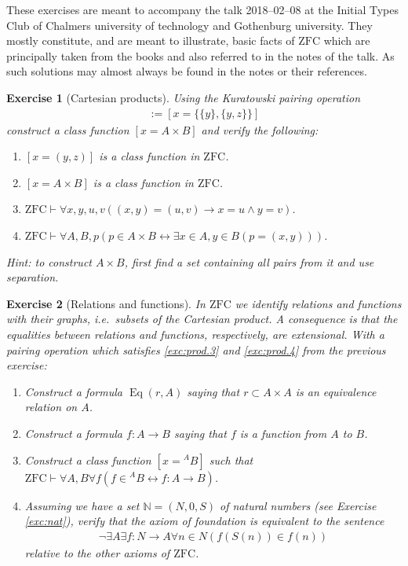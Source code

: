 \documentclass{scrartcl}
\theoremstyle{definition}
\theoremstyle{plain}
\theoremstyle{remark}
\newcommand{\N}{\ensuremath{\mathbb{N}}}
\newcommand{\ZFC}{\ensuremath{\mathrm{ZFC}}}
\newcommand{\limp}{\rightarrow}
\newcommand{\liff}{\leftrightarrow}
\newcommand{\eqdef}{:=}
\DeclareMathOperator{\Eq}{Eq}
\theoremstyle{plain}
\newtheorem{Exc}{Exercise}
\begin{document}
These exercises are meant to accompany the talk 2018--02--08 at the Initial Types Club of Chalmers university of technology and Gothenburg university. They mostly constitute, and are meant to illustrate, basic facts of $\ZFC$ which are principally taken from the books \cite{moschovakis:2006} and \cite{jech:2002} also referred to in the notes of the talk. As such solutions may almost always be found in the notes or their references.

\begin{Exc}[Cartesian products\label{exc:prod}]
  Using the Kuratowski pairing operation
  \begin{align*}
    [x = (y,z)] \eqdef [x = \{\{y\},\{y,z\}\}]
  \end{align*}
  construct a class function $[x = A \times B]$ and verify the following:
  \begin{enumerate}
  \item $[x = (y,z)]$ is a class function in $\ZFC$.
  \item $[x = A \times B]$ is a class function in $\ZFC$.
  \item $\ZFC \vdash \forall x, y, u, v ((x,y) = (u,v) \limp x = u \land y = v)$.\label{exc:prod.3}
  \item $\ZFC \vdash \forall A, B, p (p \in A \times B \liff \exists x \in A, y \in B (p = (x,y)))$.\label{exc:prod.4}
  \end{enumerate}
  Hint: to construct $A \times B$, first find a set containing all pairs from it and use separation.
\end{Exc}

\begin{Exc}[Relations and functions\label{exc:rel}]
  In $\ZFC$ we identify relations and functions with their graphs, i.e.~subsets of the Cartesian product. A consequence is that the equalities between relations and functions, respectively, are extensional. With a pairing operation which satisfies \ref{exc:prod.3} and \ref{exc:prod.4} from the previous exercise:
  \begin{enumerate}
  \item Construct a formula $\Eq(r,A)$ saying that $r \subset A \times A$ is an equivalence relation on $A$.
  \item Construct a formula $f : A \longrightarrow B$ saying that $f$ is a function from $A$ to $B$.
  \item Construct a class function $[x = {}^AB]$ such that $\ZFC \vdash \forall A, B \forall f (f \in {}^AB \liff f : A \longrightarrow B)$.
  \item Assuming we have a set $\N = (N,0,S)$ of natural numbers (see Exercise \ref{exc:nat}), verify that the axiom of foundation is equivalent to the sentence
    \begin{align*}
      \neg \exists A \exists f : N \longrightarrow A \forall n \in N (f(S(n)) \in f(n))
    \end{align*}
    relative to the other axioms of $\ZFC$.%
  \end{enumerate}
\end{Exc}
\end{document}
